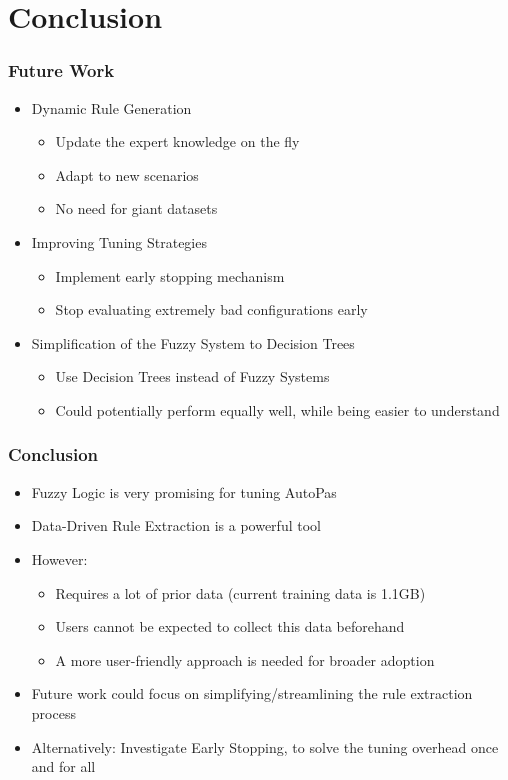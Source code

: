 \documentclass[
	10pt,
	t		%
]{beamer}
\begin{document}
\section{Conclusion}
\begin{frame}
	\frametitle{Future Work}
	\begin{itemize}
		\item Dynamic Rule Generation
		      \begin{itemize}
			      \item Update the expert knowledge on the fly
			      \item Adapt to new scenarios
			      \item No need for giant datasets
		      \end{itemize}
		\item Improving Tuning Strategies
		      \begin{itemize}
			      \item Implement early stopping mechanism
			      \item Stop evaluating extremely bad configurations early
		      \end{itemize}
		\item Simplification of the Fuzzy System to Decision Trees
		      \begin{itemize}
			      \item Use Decision Trees instead of Fuzzy Systems
			      \item Could potentially perform equally well, while being easier to understand
		      \end{itemize}
	\end{itemize}
\end{frame}


\begin{frame}
	\frametitle{Conclusion}
	\begin{itemize}
		\item Fuzzy Logic is very promising for tuning AutoPas
		\item Data-Driven Rule Extraction is a powerful tool
		\item However:
		      \begin{itemize}
			      \item Requires a lot of  prior data (current training data is 1.1GB)
			      \item Users cannot be expected to collect this data beforehand
			      \item A more user-friendly approach is needed for broader adoption
		      \end{itemize}
		\item Future work could focus on simplifying/streamlining the rule extraction process
		\item Alternatively: Investigate Early Stopping, to solve the tuning overhead once and for all
	\end{itemize}
\end{frame}
\end{document}
